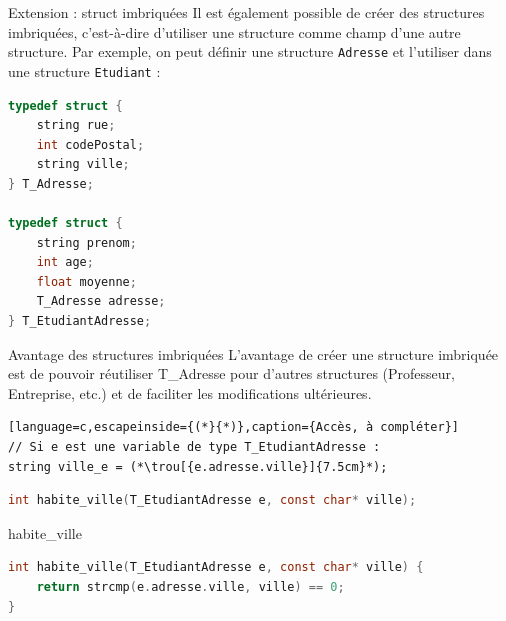 
\begin{UPSTIexercice}{Extension : struct imbriquées}
    Il est également possible de créer des structures imbriquées, c'est-à-dire d'utiliser une structure comme champ d'une autre structure. Par exemple, on peut définir une structure \texttt{Adresse} et l'utiliser dans une structure \texttt{Etudiant} :
    \begin{lstlisting}[language=C]
typedef struct {
    string rue;
    int codePostal;
    string ville;
} T_Adresse;

typedef struct {
    string prenom;
    int age;
    float moyenne;
    T_Adresse adresse;
} T_EtudiantAdresse;
\end{lstlisting}

    \begin{UPSTIeleveOnlyEnv}
    \end{UPSTIeleveOnlyEnv}
    \begin{UPSTIcorrectionP}{Avantage des structures imbriquées}
        L'avantage de créer une structure imbriquée est de pouvoir réutiliser T\_Adresse pour d'autres structures (Professeur, Entreprise, etc.) et de faciliter les modifications ultérieures.
    \end{UPSTIcorrectionP}


    \begin{lstlisting}[language=c,escapeinside={(*}{*)},caption={Accès, à compléter}]
// Si e est une variable de type T_EtudiantAdresse :
string ville_e = (*\trou[{e.adresse.ville}]{7.5cm}*);
\end{lstlisting}


    \begin{lstlisting}[language=c,caption={Prototype}]
int habite_ville(T_EtudiantAdresse e, const char* ville);
\end{lstlisting}

\begin{UPSTIeleveOnlyEnv}
\end{UPSTIeleveOnlyEnv}

\begin{UPSTIcorrectionP}{habite\_ville}
\begin{lstlisting}[language=c,caption={Correction}]
int habite_ville(T_EtudiantAdresse e, const char* ville) {
    return strcmp(e.adresse.ville, ville) == 0;
}
\end{lstlisting}
\end{UPSTIcorrectionP}
\end{UPSTIexercice}

